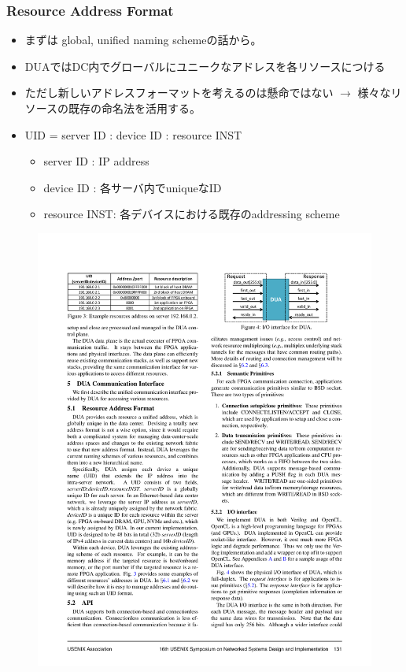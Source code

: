 \documentclass[dvipdfmx,9pt,notheorems]{beamer}
\theoremstyle{definition}
\begin{document}
\begin{frame}\frametitle{Resource Address Format}
	\begin{itemize}
		\item まずは{\color{red} global, unified naming scheme}の話から。
		\item DUAではDC内でグローバルにユニークなアドレスを各リソースにつける
		\item ただし新しいアドレスフォーマットを考えるのは懸命ではない $\rightarrow$ 様々なリソースの既存の命名法を活用する。
		\item UID = server ID : device ID : resource INST
			\begin{itemize}
				\item server ID : IP address
				\item device ID : 各サーバ内でuniqueなID
				\item resource INST: 各デバイスにおける既存のaddressing scheme
			\end{itemize}
	\end{itemize}
  \begin{figure}[htb]
		\includegraphics[scale=1.0]{fig/figure3.pdf}
  \end{figure}
\end{frame}
\end{document}
